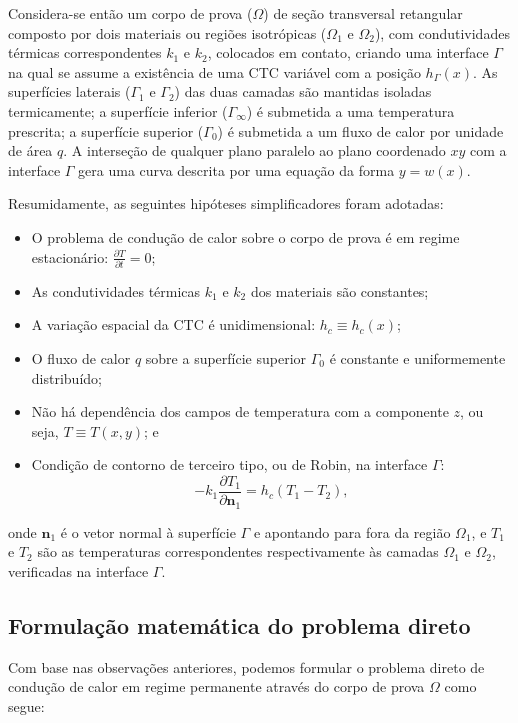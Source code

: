 Considera-se então um corpo de prova ($\Omega$) de seção transversal retangular composto por dois materiais ou regiões isotrópicas ($\Omega_1$ e $\Omega_2$), com
condutividades térmicas correspondentes $k_1$  e $k_2$, colocados em contato,
criando uma interface $\Gamma$ na qual se assume a existência de uma CTC variável com a posição $h_\Gamma(x)$.
As superfícies laterais ($\Gamma_1$ e $\Gamma_2$) das duas camadas são mantidas isoladas termicamente;
a superfície inferior ($\Gamma_\infty$) é submetida a uma temperatura prescrita; a superfície superior ($\Gamma_0$) é submetida
a um fluxo de calor por unidade de área $q$. A interseção de qualquer plano paralelo ao plano coordenado $xy$ com a interface $\Gamma$ gera uma
curva descrita por uma equação da forma $y = w(x)$.

Resumidamente, as seguintes hipóteses simplificadores foram adotadas:
\begin{itemize}
  \item O problema de condução de calor sobre o corpo de prova é em regime estacionário: $\displaystyle\frac{\partial T}{\partial t} = 0$;
  \item As condutividades térmicas $k_1$ e $k_2$ dos materiais são constantes;
  \item A variação espacial da CTC é unidimensional: $h_c \equiv h_c(x)$;
  \item O fluxo de calor $q$ sobre a superfície superior $\Gamma_0$ é constante e uniformemente distribuído;
  \item Não há dependência dos campos de temperatura com a componente $z$, ou seja, $T \equiv T(x, y)$; e
  \item Condição de contorno de terceiro tipo, ou de Robin, na interface $\Gamma$:
  		\begin{equation*}
  			-k_1\frac{\partial T_1}{\partial \mathbf{n}_1} = h_c(T_1 - T_2),
  		\end{equation*}   
\end{itemize} 
onde
$\mathbf{n}_1$ é o vetor normal à superfície $\Gamma$ e apontando para fora da região $\Omega_1$, e $T_1$ e $T_2$ são as temperaturas
correspondentes respectivamente às camadas $\Omega_1$ e $\Omega_2$, verificadas na interface $\Gamma$.

\subsection{Formulação matemática do problema direto}\label{sec_formulacao_direta}
Com base nas observações anteriores, podemos formular o problema direto de condução de calor em regime permanente através do corpo de prova $\Omega$ como segue: 

